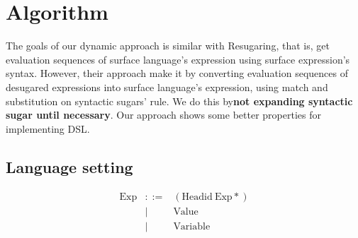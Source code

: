 \section{Algorithm}
\label{sec3}

The goals of our dynamic approach is similar with Resugaring\cite{resugaring}\cite{hygienic}, that is, get evaluation sequences of surface language's expression using surface expression's syntax. However, their approach make it by converting evaluation sequences of desugared expressions into surface language's expression, using match and substitution on syntactic sugars' rule. We do this by{\bfseries not expanding syntactic sugar until necessary}. Our approach shows some better properties for implementing DSL.

\subsection{Language setting}

\[
\begin{array}{rcl}
\mbox{Exp} &::=& (\mbox{Headid}~\mbox{Exp}*)\\
&|& \mbox{Value}\\
&|& \mbox{Variable}
\end{array}
\]

\begin{center}
	\framebox[35em][l]{
		\parbox[t]{35em}{
			\[
			\begin{array}{rcl}
			\mbox{Exp} &::=& \mbox{Coreexp}\\
			&|& \mbox{Surfexp}\\
			&|& \mbox{Commonexp}\\
			&|& \mbox{OtherSurfexp}\\
			&|& \mbox{OtherCommonexp}
			\end{array}
			\]
			
			\[
			\begin{array}{rcl}
			\mbox{Coreexp} &::=& (\mbox{CoreHead}~\mbox{Exp}*)
			\end{array}
			\]
			
			\[
			\begin{array}{rcl}
			\mbox{Surfexp} &::=& (\mbox{SurfHead}~(\mbox{Surfexp}~|~\mbox{Commonexp})*)
			\end{array}
			\]
			
			\[
			\begin{array}{rcl}
			\mbox{Commonexp} &::=& (\mbox{CommonHead}~(\mbox{Surfexp}~|~\mbox{Commonexp})*)\\
			&|& \mbox{Value}\\
			&|& \mbox{Variable}
			\end{array}
			\]
			
			\[
			\begin{array}{rcl}
			\mbox{OtherSurfexp} &::=& (\mbox{SurfHead}~\mbox{Exp}*~\mbox{Coreexp}~\mbox{Exp}*)
			\end{array}
			\]
			
			\[
			\begin{array}{rcl}
			\mbox{OtherCommonexp} &::=& (\mbox{CommonHead}~\mbox{Exp}*~\mbox{Coreexp}~\mbox{Exp}*)
			\end{array}
			\]
		}
	}
\end{center}


